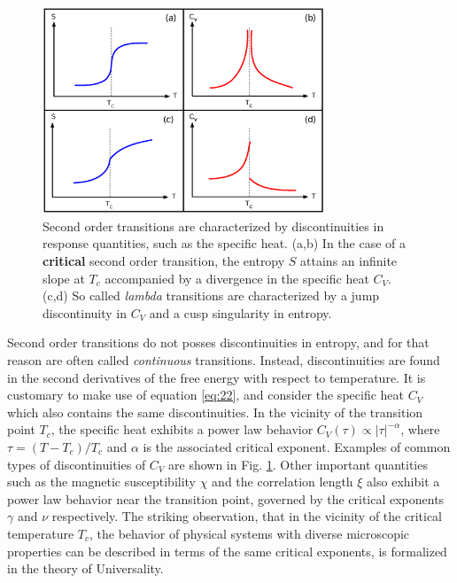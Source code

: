 \documentclass[12pt]{report}
\begin{document}
\newpage

\begin{figure}
\center
\includegraphics[width = 0.75\textwidth]{chapter2Figs/CanonicalSecondOrder.eps}
\caption{\label{fig:Fig_4}%
Second order transitions are characterized by discontinuities in response quantities, such as the specific heat. (a,b) In the case of a \textbf{critical} second order transition, the entropy $S$ attains an infinite slope at $T_{c}$ accompanied by a divergence in the specific heat $C_{V}$. (c,d) So called \textit{lambda} transitions are characterized by a jump discontinuity in $C_{V}$ and a cusp singularity in entropy.}
\end{figure}

Second order transitions do not posses discontinuities in entropy, and for that reason are often called \textit{continuous} transitions. Instead, discontinuities are found in the second derivatives of the free energy with respect to temperature. It is customary to make use of equation\,\,\ref{eq:22}, and consider the specific heat $C_{V}$ which also contains the same discontinuities.
In the vicinity of the transition point $T_{c}$, the specific heat exhibits a power law behavior $C_{V}(\tau) \propto \left| \tau \right|^{-\alpha}$, where $\tau = \left(T-T_{c}\right)/T_{c}$ and $\alpha$ is the associated critical exponent. Examples of common types of discontinuities of $C_{V}$ are shown in Fig. \ref{fig:Fig_4}. Other important quantities such as the magnetic susceptibility $\chi$ and the correlation length $\xi$ also exhibit a power law behavior near the transition point, governed by the critical exponents $\gamma$ and $\nu$ respectively. The striking observation, that in the vicinity of the critical temperature $T_{c}$, the behavior of physical systems with diverse microscopic properties can be described in terms of the same critical exponents, is formalized in the theory of Universality\cite{Kardar2009}. 
\end{document}

